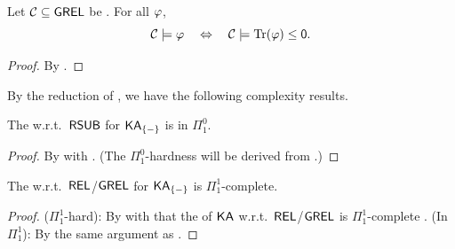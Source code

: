 
\newcommand{\cl}{\mathrm{cl}}
\begin{theorem}\label{theorem: quantifier-free formula to equation on RSUB}
    Let $\algclass \subseteq \GREL$ be .
    For all  $\fml$,\hspace{.5em} 
    \[\algclass \models \fml \quad\Leftrightarrow\quad  \algclass \models \mathrm{Tr}(\fml) \le \emp.\]
\end{theorem}
\begin{proof}
    By .
\end{proof}
By the reduction of , we have the following complexity results.
\begin{corollary}\label{corollary: quantifier-free theory RSUB KA-}
    The  w.r.t.\ $\mathsf{RSUB}$ for $\mathsf{KA}_{\{-\}}$  is in $\Pi^{0}_{1}$.
\end{corollary}
\begin{proof}
    By  with .
    (The $\Pi^{0}_{1}$-hardness will be derived from .)
\end{proof}
\begin{corollary}\label{corollary: equational theory REL/GREL KA}
    The  w.r.t.\ $\mathsf{REL}$/$\mathsf{GREL}$ for $\mathsf{KA}_{\{-\}}$  is $\Pi^{1}_{1}$-complete.
\end{corollary}
\begin{proof}
    ($\Pi^{1}_{1}$-hard):
    By  with that the  of $\mathsf{KA}$ w.r.t.\ $\mathsf{REL}$/$\mathsf{GREL}$ is $\Pi^{1}_{1}$-complete \cite{hardinComplexityHornTheory2003}.
    (In $\Pi^{1}_{1}$):
    By the same argument as \cite{hardinComplexityHornTheory2003}.
\end{proof}

